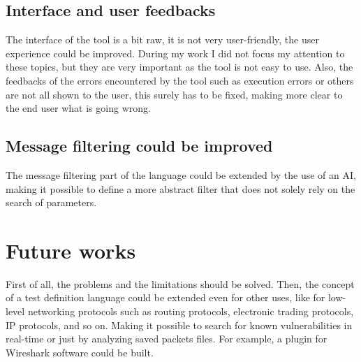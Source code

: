 \subsection{Interface and user feedbacks}
The interface of the tool is a bit raw, it is not very user-friendly, the user experience could be improved. During my work I did not focus my attention to these topics, but they are very important as the tool is not easy to use. Also, the feedbacks of the errors encountered by the tool such as execution errors or others are not all shown to the user, this surely has to be fixed, making more clear to the end user what is going wrong.

\subsection{Message filtering could be improved}
The message filtering part of the language could be extended by the use of an AI, making it possible to define a more abstract filter that does not solely rely on the search of parameters.

\section{Future works}
First of all, the problems and the limitations should be solved. Then, the concept of a test definition language could be extended even for other uses, like for low-level networking protocols such as routing protocols, electronic trading protocols, IP protocols, and so on. Making it possible to search for known vulnerabilities in real-time or just by analyzing saved packets files. For example, a plugin for Wireshark software could be built.





